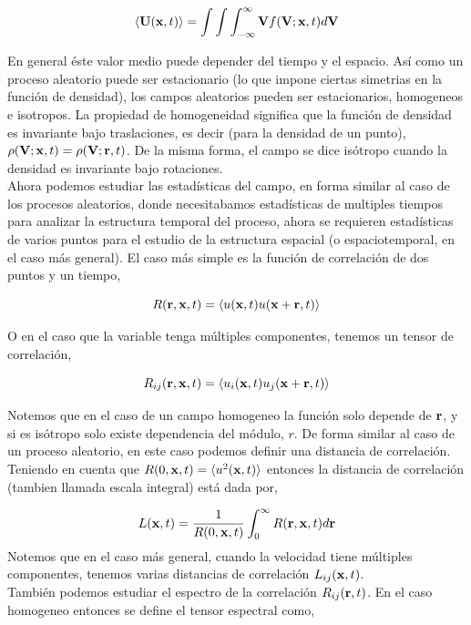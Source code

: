 \documentclass[executivepaper,12pt]{article}
\numberwithin{equation}{section}
\begin{document}
\begin{equation*}
	\langle \vb{U}(\vb{x},t) \rangle= \int \int \int _{-\infty}^{\infty} \vb{V}f(\vb{V};\vb{x},t)d\vb{V}
\end{equation*} 

En general éste valor medio puede depender del tiempo y el espacio. Así como un proceso aleatorio puede ser estacionario (lo que impone ciertas simetrias en la función de densidad), los campos aleatorios pueden ser estacionarios, homogeneos e isotropos. La propiedad de homogeneidad significa que la función de densidad es invariante bajo traslaciones, es decir (para la densidad de un punto), $\rho(\vb{V};\vb{x},t)=\rho(\vb{V};\vb{r},t)$. De la misma forma, el campo se dice isótropo cuando la densidad es invariante bajo rotaciones.\\

Ahora podemos estudiar las estadísticas del campo, en forma similar al caso de los procesos aleatorios, donde necesitabamos estadísticas de multiples tiempos para analizar la estructura temporal del proceso, ahora se requieren estadísticas de varios puntos para el estudio de la estructura espacial (o espaciotemporal, en el caso más general). El caso más simple es la función de correlación de dos puntos y un tiempo,

\begin{equation*}
	R(\vb{r},\vb{x},t)=\langle u(\vb{x},t)u(\vb{x}+\vb{r},t) \rangle
\end{equation*}    

O en el caso que la variable tenga múltiples componentes, tenemos un tensor de correlación,

\begin{equation*}
	R_{ij}(\vb{r},\vb{x},t)=\langle u_i(\vb{x},t)u_j(\vb{x}+\vb{r},t) \rangle
\end{equation*}

Notemos que en el caso de un campo homogeneo la función solo depende de $\vb{r}$, y si es isótropo solo existe dependencia del módulo, $r$. De forma similar al caso de un proceso aleatorio, en este caso podemos definir una distancia de correlación. Teniendo en cuenta que $R(0,\vb{x},t)=\langle u^2(\vb{x},t) \rangle$ entonces la distancia de correlación (tambien llamada escala integral) está dada por,

\begin{equation*}
	L(\vb{x},t)=\frac{1}{R(0,\vb{x},t)}\int_{0}^{\infty} R(\vb{r},\vb{x},t) d\vb{r} 
\end{equation*}
Notemos que en el caso más general, cuando la velocidad tiene múltiples componentes, tenemos varias distancias de correlación $L_{ij}(\vb{x},t)$. \\
También podemos estudiar el espectro de la correlación $R_{ij}(\vb{r},t)$. En el caso homogeneo entonces se define el tensor espectral como,
\end{document}
